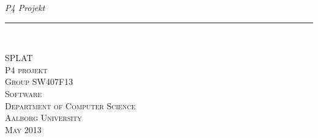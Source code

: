 \thispagestyle{empty}
\begin{flushright}
\vspace{3cm}

\phantom{hul}

\phantom{hul}

\phantom{hul}

\textsl{P4 Projekt} \\ \vspace{1cm}

\rule{0.8\textwidth}{3mm} \\ \vspace{1.5cm}
\vspace{1cm}


\vspace{2cm} 
\textsc{\Large SPLAT \\
P4 projekt\\
Group SW407F13\\
Software\\
Department of Computer Science\\
Aalborg University\\
May 2013\\
}
\end{flushright}
